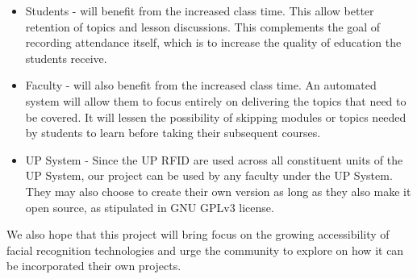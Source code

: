 	\begin{itemize}
		\item Students - will benefit from the increased class time. This allow better retention of topics and lesson discussions. This complements the goal of recording attendance itself, which is to increase the quality of education the students receive.
	\end{itemize}
	\begin{itemize}
		\item Faculty - will also benefit from the increased class time. An automated system will allow them to focus entirely on delivering the topics that need to be covered. It will lessen the possibility of skipping modules or topics needed by students to learn before taking their subsequent courses. 
	\end{itemize}
	\begin{itemize}
		\item UP System - Since the UP RFID are used across all constituent units of the UP System, our project can be used by any faculty under the UP System. They may also choose to create their own version as long as they also make it open source, as stipulated in GNU GPLv3 license.
	\end{itemize}
	
	
	We also hope that this project will bring focus on the growing accessibility of facial recognition technologies and urge the community to explore on how it can be incorporated their own projects.
	
\begin{comment}
	content...%
	\begin{itemize}
		\item  What is the relevance of your work to the computer science community? 
		
		\begin{itemize} 
			\item What will be your technical contributions, in terms of algorithms, or approaches, or new domain? 
			\item What is your value-added compared to existing systems? 
		\end{itemize}
		
		\item What will be your contributions to society in general? 
		\begin{itemize}
			\item Who will benefit from your system? 
			\item Who are your target users and how will this system benefit them? 
		\end{itemize}
	\end{itemize}
	
		If applicable, describe possible commercialization and/or innovation in your research.

\end{comment}

